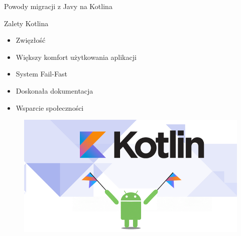\documentclass{beamer}
\begin{document}
\begin{frame}{Powody migracji z Javy na Kotlina}

\begin{block}{Zalety Kotlina}
\begin{itemize}
    \item Zwięzłość
    \item Większy komfort użytkowania aplikacji
    \item System Fail-Fast
    \item Doskonała dokumentacja
    \item Wsparcie społeczności
\end{itemize}
\end{block}

\begin{figure}
    \centering
    \includegraphics[scale=0.2]{pic/andr_kotlin.png}
    \label{fig:my_label}
\end{figure}

\end{frame}
\end{document}
